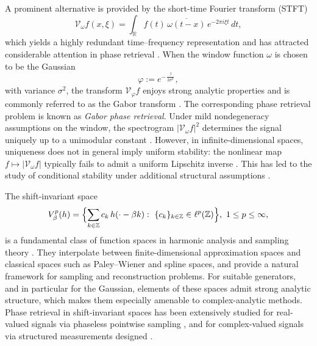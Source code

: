 \documentclass[11pt, reqno]{amsart}
\newcommand{\R}{\mathbb{R}}
\numberwithin{equation}{section}
\begin{document}
A prominent alternative is provided by the short-time Fourier transform (STFT) 
$$\mathcal{V}_\omega f(x,\xi)= \int_{\R} f(t)\,\overline{\omega(t-x)}\,e^{-2\pi i \xi t}\,dt,$$
which yields a highly redundant time--frequency representation and has attracted considerable attention in phase retrieval  \cite{alaifari2024connection,alaifari2021uniqueness,alaifari2022phase,bartusel2023injectivity,chen2025sampling,grohs2020phase,grohs2022foundational,grohs2023nonuniqueness,grohs2025completeness,grohs2019stable,wellersho?2024injectivity,wellersho?2024phase,wellersho?2025dense}. When the window function $\omega$ is chosen to be the Gaussian
$$\varphi:=e^{-\frac{\cdot^2}{2\sigma^2}},$$
with variance $\sigma^2$, the transform $\mathcal{V}_\varphi f$ enjoys strong analytic properties and is commonly referred to as the Gabor transform \cite{grochenig2001foundations}. The corresponding phase retrieval problem is known as \emph{Gabor phase retrieval}. Under mild nondegeneracy assumptions on the window, the spectrogram $|\mathcal{V}_\omega f|^2$ determines the signal uniquely up to a unimodular constant \cite{alaifari2021uniqueness,bartusel2023injectivity,grohs2020phase,grohs2019stable}. However, in infinite-dimensional spaces, uniqueness does not in general imply uniform stability: the nonlinear map $f\mapsto |\mathcal{V}_\omega f|$ typically fails to admit a uniform Lipschitz inverse \cite{alaifari2017phase,cahill2016phase}. This has led to the study of conditional stability under additional structural assumptions \cite{alaifari2021gabor,grohs2019stable,grohs2022stable}. 

The shift-invariant space 
$$ V_\beta^p(h) = \Bigl\{ \sum_{k\in\mathbb Z} c_k\,h(\cdot-\beta k):\ \{c_k\}_{k\in\mathbb Z}\in \ell^p(\mathbb Z) \Bigr\},  \ 1\le p\le \infty, $$
is a fundamental class of function spaces in harmonic analysis and sampling theory \cite{aldroubi2001nonuniform,aldroubi2001pframes,aldroubi2005convolution,deboor1994structure,grochenig2018sampling}. They interpolate between finite-dimensional approximation spaces and classical spaces such as Paley--Wiener and spline spaces, and provide a natural framework for sampling and reconstruction problems. For suitable generators, and in particular for the Gaussian, elements of these spaces admit strong analytic structure, which makes them especially amenable to complex-analytic methods.  Phase retrieval in shift-invariant spaces has been extensively studied for real-valued signals via phaseless pointwise sampling \cite{chen2020phase,cheng2021stable,cheng2019phaseless,cheng2021stable2,grochenig2020phase,li2025global,romero2021sign,sun2021local,thakur2011reconstruction}, and for complex-valued signals via structured measurements designed  \cite{chen2024conjugate,cheng2025conjugate,lai2021conjugate,mc2004phase}. 
\end{document}
